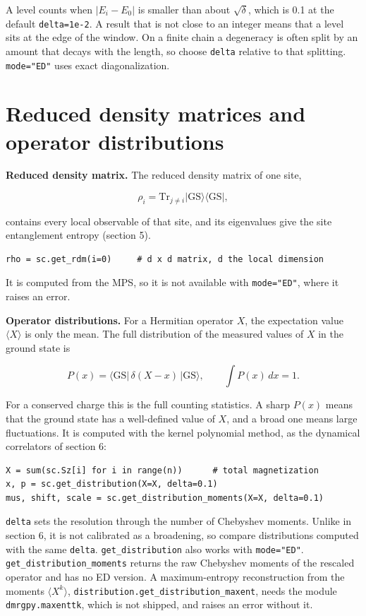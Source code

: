 \documentclass[11pt]{article}
\begin{document}
A level counts when \(|E_i-E_0|\) is smaller than about \(\sqrt{\delta}\),
which is 0.1 at the default \texttt{delta=1e-2}. A result that is not close to
an integer means that a level sits at the edge of the window. On a finite
chain a degeneracy is often split by an amount that decays with the
length, so choose \texttt{delta} relative to that splitting. \texttt{mode="ED"} uses
exact diagonalization.

\section{Reduced density matrices and operator distributions}

\textbf{Reduced density matrix.} The reduced density matrix of one site,

\[\rho_i=\mathrm{Tr}_{j\neq i}|\mathrm{GS}\rangle\langle\mathrm{GS}|,\]

contains every local observable of that site, and its eigenvalues give the
site entanglement entropy (section 5).

\begin{lstlisting}
rho = sc.get_rdm(i=0)     # d x d matrix, d the local dimension
\end{lstlisting}

It is computed from the MPS, so it is not available with \texttt{mode="ED"},
where it raises an error.

\textbf{Operator distributions.} For a Hermitian operator \(X\), the expectation
value \(\langle X\rangle\) is only the mean. The full distribution of the
measured values of \(X\) in the ground state is

\[P(x)=\langle\mathrm{GS}|\,\delta(X-x)\,|\mathrm{GS}\rangle,\qquad
\int P(x)\,dx=1.\]

For a conserved charge this is the full counting statistics. A sharp
\(P(x)\) means that the ground state has a well-defined value of \(X\), and a
broad one means large fluctuations. It is computed with the kernel
polynomial method, as the dynamical correlators of section 6:

\begin{lstlisting}
X = sum(sc.Sz[i] for i in range(n))      # total magnetization
x, p = sc.get_distribution(X=X, delta=0.1)
mus, shift, scale = sc.get_distribution_moments(X=X, delta=0.1)
\end{lstlisting}

\texttt{delta} sets the resolution through the number of Chebyshev moments.
Unlike in section 6, it is not calibrated as a broadening, so compare
distributions computed with the same \texttt{delta}. \texttt{get\_\allowbreak{}distribution} also
works with \texttt{mode="ED"}. \texttt{get\_\allowbreak{}distribution\_\allowbreak{}moments} returns the raw
Chebyshev moments of the rescaled operator and has no ED version. A
maximum-entropy reconstruction from the moments \(\langle X^k\rangle\),
\texttt{distribution.\allowbreak{}get\_\allowbreak{}distribution\_\allowbreak{}maxent}, needs the module
\texttt{dmrgpy.\allowbreak{}maxenttk}, which is not shipped, and raises an error without it.
\end{document}
